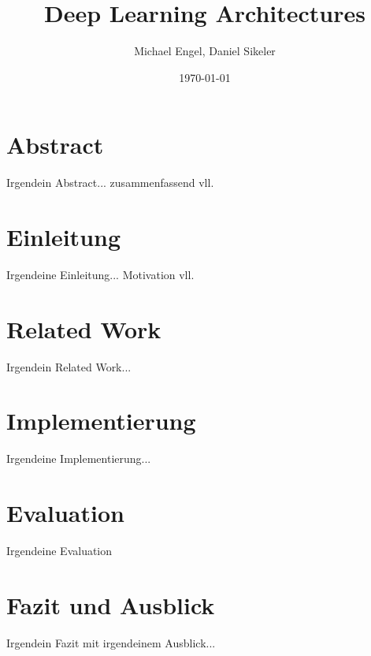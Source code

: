 \documentclass{IEEEtran}
\title{Deep Learning Architectures}
\author{Michael Engel, Daniel Sikeler}
\date{\today}
\begin{document}
\maketitle
\section{Abstract}
\label{sec:abstract}
Irgendein Abstract... zusammenfassend vll. 

\section{Einleitung}
\label{sec:einleitung}
Irgendeine Einleitung... Motivation vll. 

\section{Related Work}
\label{sec:relatedwork}
Irgendein Related Work...

\section{Implementierung}
Irgendeine Implementierung...

\section{Evaluation}
Irgendeine Evaluation

\section{Fazit und Ausblick}
\label{sec:ausblick}
Irgendein Fazit mit irgendeinem Ausblick...

{}
\end{document}
